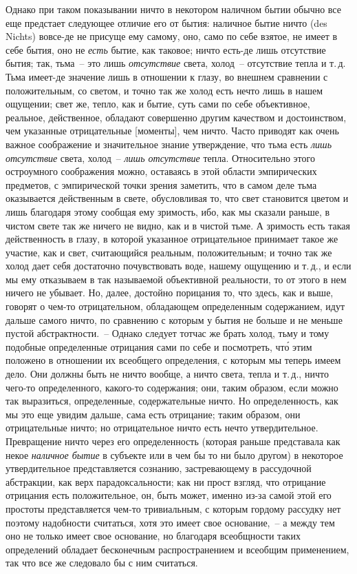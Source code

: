 Однако при таком показывании ничто в некотором
наличном бытии обычно все еще предстает следующее
отличие его от бытия: наличное бытие ничто (des Nichts)
вовсе-де не присуще ему самому, оно, само по себе взятое,
не имеет в себе бытия, оно не \emph{есть} бытие, как таковое;
ничто есть-де лишь отсутствие бытия; так, тьма~-- это
лишь \emph{отсутствие} света, холод~-- отсутствие тепла и т.\,д.
Тьма имеет-де значение лишь в отношении к глазу, во
внешнем сравнении с положительным, со светом, и точно
так же холод есть нечто лишь в нашем ощущении; свет
же, тепло, как и бытие, суть сами по себе объективное,
реальное, действенное, обладают совершенно другим качеством
и достоинством, чем указанные отрицательные
[моменты], чем ничто. Часто приводят как очень важное
соображение и значительное знание утверждение, что
тьма есть \emph{лишь отсутствие} света, холод~-- \emph{лишь отсутствие}
тепла. Относительно этого остроумного соображения
можно, оставаясь в этой области эмпирических предметов,
с эмпирической точки зрения заметить, что в
самом деле тьма оказывается действенным в свете, обусловливая
то, что свет становится цветом\endnotemark{} и лишь благодаря
этому сообщая ему зримость, ибо, как мы сказали
раньше, в чистом свете так же ничего не видно, как и в
чистой тьме. А зримость есть такая действенность в глазу,
в которой указанное отрицательное принимает такое
же участие, как и свет, считающийся реальным, положительным;
и точно так же холод дает себя достаточно почувствовать
воде, нашему ощущению и т.\,д., и если мы
ему отказываем в так называемой объективной реальности,
то от этого в нем ничего не убывает. Но, далее, достойно
порицания то, что здесь, как и выше, говорят о
чем-то отрицательном, обладающем определенным содержанием,
идут дальше самого ничто, по сравнению с которым
у бытия не больше и не меньше пустой абстрактности.~--
Однако следует тотчас же брать холод, тьму
и тому подобные определенные отрицания сами по себе и
посмотреть, чт\'о этим положено в отношении их всеобщего
определения, с которым мы теперь имеем дело. Они
должны быть не ничто вообще, а ничто света, тепла и т.\,д.,
ничто чего-то определенного, какого-то содержания; они,
таким образом, если можно так выразиться, определенные,
содержательные ничто. Но определенность, как мы
это еще увидим дальше, сама есть отрицание; таким образом,
они отрицательные ничто; но отрицательное ничто
есть нечто утвердительное. Превращение ничто через его
определенность (которая раньше представала как некое
\emph{наличное бытие} в субъекте или в чем бы то ни было другом)
в некоторое утвердительное представляется сознанию,
застревающему в рассудочной абстракции, как верх
парадоксальности; как ни прост взгляд, что отрицание
отрицания есть положительное, он, быть может, именно
из-за самой этой его простоты представляется чем-то
тривиальным, с которым гордому рассудку нет поэтому
надобности считаться, хотя это имеет свое основание,~--
а между тем оно не только имеет свое основание, но благодаря
всеобщности таких определений обладает бесконечным
распространением и всеобщим применением, так
что все же следовало бы с ним считаться.

